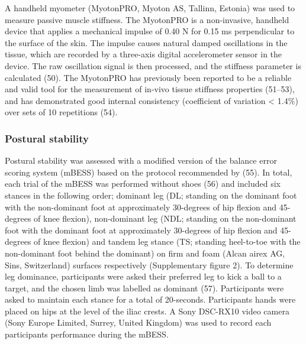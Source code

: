 \documentclass[
  english,
  man]{apa6}
\begin{document}
A handheld myometer (MyotonPRO, Myoton AS, Tallinn, Estonia) was used to measure passive muscle stiffness.
The MyotonPRO is a non-invasive, handheld device that applies a mechanical impulse of 0.40 N for 0.15 ms perpendicular to the surface of the skin.
The impulse causes natural damped oscillations in the tissue, which are recorded by a three-axis digital accelerometer sensor in the device.
The raw oscillation signal is then processed, and the stiffness parameter is calculated (50).
The MyotonPRO has previously been reported to be a reliable and valid tool for the measurement of in-vivo tissue stiffness properties (51--53), and has demonstrated good internal consistency (coefficient of variation \textless{} 1.4\%) over sets of 10 repetitions (54).

\hypertarget{postural-stability}{%
\subsubsection{Postural stability}\label{postural-stability}}

Postural stability was assessed with a modified version of the balance error scoring system (mBESS) based on the protocol recommended by (55).
In total, each trial of the mBESS was performed without shoes (56) and included six stances in the following order; dominant leg (DL; standing on the dominant foot with the non-dominant foot at approximately 30-degrees of hip flexion and 45-degrees of knee flexion),
non-dominant leg (NDL; standing on the non-dominant foot with the dominant foot at approximately 30-degrees of hip flexion and 45-degrees of knee flexion)
and tandem leg stance (TS; standing heel-to-toe with the non-dominant foot behind the dominant) on firm and foam (Alcan airex AG, Sins, Switzerland) surfaces respectively (Supplementary figure 2).
To determine leg dominance, participants were asked their preferred leg to kick a ball to a target, and the chosen limb was labelled as dominant (57).
Participants were asked to maintain each stance for a total of 20-seconds.
Participants hands were placed on hips at the level of the iliac crests.
A Sony DSC-RX10 video camera (Sony Europe Limited, Surrey, United Kingdom) was used to record each participants performance during the mBESS.
\end{document}
